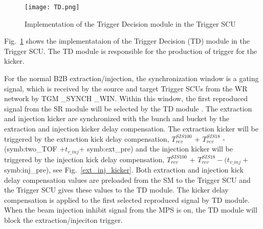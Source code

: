 %
 \begin{figure}[!htb]
   \centering   
   \texttt{[image: TD.png]}
   \caption{Implementation of the Trigger Decision module in the Trigger SCU}
   \label{TD}
\end{figure}
Fig.~\ref{TD} shows the implementataion of the Trigger Decision (TD) module in the Trigger SCU.  The TD module is responsible for the production of trigger for the kicker. 

For the normal B2B extraction/injection, the synchronization window is a gating signal, which is received by the source and target Trigger SCUs from the WR network by TGM \_SYNCH \_WIN. Within this window, the first reproduced signal from the SR module will be selected by the \gls{TD} module . The extraction and injection kicker are synchronized with the bunch and bucket by the extraction and injection kicker delay compensation. The extraction kicker will be triggered by the extraction kick delay compensation, $T_{\mathit{rev}}^{\mathit{SIS100}}$ + $T_{\mathit{rev}}^{\mathit{SIS18}}$ -(\gls{symb:two_TOF} +$ t_{v\_inj}$+ \gls{symb:ext_pre}) and the injection kicker will be triggered by the injection kick delay compensation, $T_{\mathit{rev}}^{\mathit{SIS100}}$ + $T_{\mathit{rev}}^{\mathit{SIS18}} - (t_{v\_inj}+$ \gls{symb:inj_pre}), see Fig.~\ref{ext_inj_kicker}. Both extraction and injection kick delay compensation values are preloaded from the SM to the Trigger SCU and the Trigger SCU gives these values to the TD module. The kicker delay compensation is applied to the first selected reproduced signal by TD module. When the beam injection inhibit signal from the MPS is on, the TD module will block the extraction/injeciton trigger.

